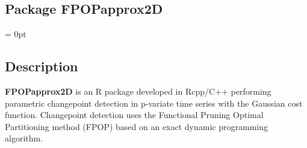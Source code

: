 \documentclass{report}
\begin{document}
	\begin{center} \section*{Package FPOPapprox2D}\end{center}

	\parindent = 0pt
	\subsection*{Description}
	
	{\bfseries FPOPapprox2D} is an R package developed in Rcpp/C++ performing parametric changepoint detection in p-variate time series with  the Gaussian cost function. Changepoint detection uses the Functional Pruning Optimal Partitioning method (FPOP) based on an exact dynamic programming algorithm.
	
\end{document}
